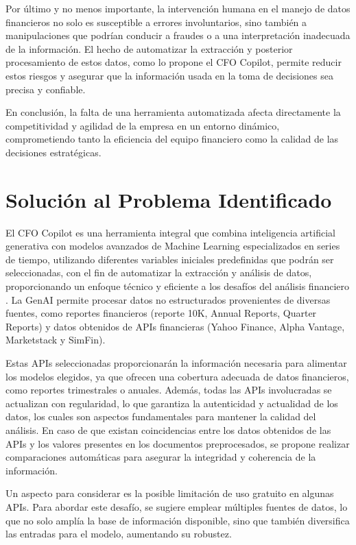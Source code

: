 \documentclass[12pt,letterpaper,oneside]{report}
\renewcommand{\_}{\UnderscoreOriginal\allowbreak}
\begin{document}
Por último y no menos importante, la intervención humana en el manejo de datos financieros no solo es susceptible a errores involuntarios, sino también a manipulaciones que podrían conducir a fraudes o a una interpretación inadecuada de la información. El hecho de automatizar la extracción y posterior procesamiento de estos datos, como lo propone el CFO Copilot, permite reducir estos riesgos y asegurar que la información usada en la toma de decisiones sea precisa y confiable.

En conclusión, la falta de una herramienta automatizada afecta directamente la competitividad y agilidad de la empresa en un entorno dinámico, comprometiendo tanto la eficiencia del equipo financiero como la calidad de las decisiones estratégicas. \parencite{PerezMarroquin2024}


\section{Solución al Problema Identificado}
El CFO Copilot es una herramienta integral que combina inteligencia artificial generativa \parencite{Sauvola2024} con modelos avanzados de Machine Learning especializados en series de tiempo, utilizando diferentes variables iniciales predefinidas que podrán ser seleccionadas, con el fin de automatizar la extracción y análisis de datos, proporcionando un enfoque técnico y eficiente a los desafíos del análisis financiero \parencite{Fernandez2019}. La GenAI permite procesar datos no estructurados provenientes de diversas fuentes, como reportes financieros (reporte 10K, Annual Reports, Quarter Reports) y datos obtenidos de APIs financieras (Yahoo Finance, Alpha Vantage, Marketstack y SimFin).

Estas APIs seleccionadas proporcionarán la información necesaria para alimentar los modelos elegidos, ya que ofrecen una cobertura adecuada de datos financieros, como reportes trimestrales o anuales. Además, todas las APIs involucradas se actualizan con regularidad, lo que garantiza la autenticidad y actualidad de los datos, los cuales son aspectos fundamentales para mantener la calidad del análisis. En caso de que existan coincidencias entre los datos obtenidos de las APIs y los valores presentes en los documentos preprocesados, se propone realizar comparaciones automáticas para asegurar la integridad y coherencia de la información.

Un aspecto para considerar es la posible limitación de uso gratuito en algunas APIs. Para abordar este desafío, se sugiere emplear múltiples fuentes de datos, lo que no solo amplía la base de información disponible, sino que también diversifica las entradas para el modelo, aumentando su robustez.
\end{document}
